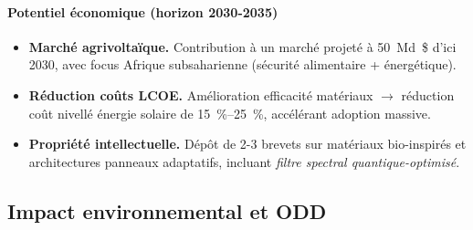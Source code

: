 \documentclass[12pt, a4paper]{article}
\begin{document}
\paragraph{Potentiel économique (horizon 2030-2035)}
\begin{itemize}
    \item \textbf{Marché agrivoltaïque.} Contribution à un marché projeté à \SI{50}{Md\$} d'ici 2030, avec focus Afrique subsaharienne (sécurité alimentaire + énergétique).

    \item \textbf{Réduction coûts LCOE.} Amélioration efficacité matériaux $\rightarrow$ réduction coût nivellé énergie solaire de \SIrange{15}{25}{\percent}, accélérant adoption massive.

    \item \textbf{Propriété intellectuelle.} Dépôt de 2-3 brevets sur matériaux bio-inspirés et architectures panneaux adaptatifs, incluant \textit{filtre spectral quantique-optimisé}.
\end{itemize}

\subsection{Impact environnemental et ODD}
\end{document}
